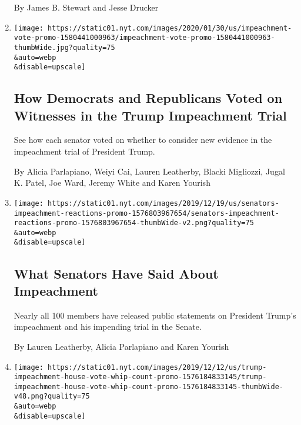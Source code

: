 \begin{enumerate}
  By James B. Stewart and Jesse Drucker
\item
  \href{/interactive/2020/01/31/us/politics/impeachment-vote.html}{}

  \texttt{[image: https://static01.nyt.com/images/2020/01/30/us/impeachment-vote-promo-1580441000963/impeachment-vote-promo-1580441000963-thumbWide.jpg?quality=75\\\&auto=webp\\\&disable=upscale]}

  \hypertarget{how-democrats-and-republicans-voted-on-witnesses-in-the-trump-impeachment-trial}{%
  \subsection{How Democrats and Republicans Voted on Witnesses in the
  Trump Impeachment
  Trial}\label{how-democrats-and-republicans-voted-on-witnesses-in-the-trump-impeachment-trial}}

  See how each senator voted on whether to consider new evidence in the
  impeachment trial of President Trump.

  By Alicia Parlapiano, Weiyi Cai, Lauren Leatherby, Blacki Migliozzi,
  Jugal K. Patel, Joe Ward, Jeremy White and Karen Yourish
\item
  \href{/interactive/2019/12/20/us/politics/senators-impeachment-reactions.html}{}

  \texttt{[image: https://static01.nyt.com/images/2019/12/19/us/senators-impeachment-reactions-promo-1576803967654/senators-impeachment-reactions-promo-1576803967654-thumbWide-v2.png?quality=75\\\&auto=webp\\\&disable=upscale]}

  \hypertarget{what-senators-have-said-about-impeachment}{%
  \subsection{What Senators Have Said About
  Impeachment}\label{what-senators-have-said-about-impeachment}}

  Nearly all 100 members have released public statements on President
  Trump's impeachment and his impending trial in the Senate.

  By Lauren Leatherby, Alicia Parlapiano and Karen Yourish
\item
  \href{/interactive/2019/12/12/us/politics/trump-impeachment-house-vote-whip-count.html}{}

  \texttt{[image: https://static01.nyt.com/images/2019/12/12/us/trump-impeachment-house-vote-whip-count-promo-1576184833145/trump-impeachment-house-vote-whip-count-promo-1576184833145-thumbWide-v48.png?quality=75\\\&auto=webp\\\&disable=upscale]}


\end{enumerate}
